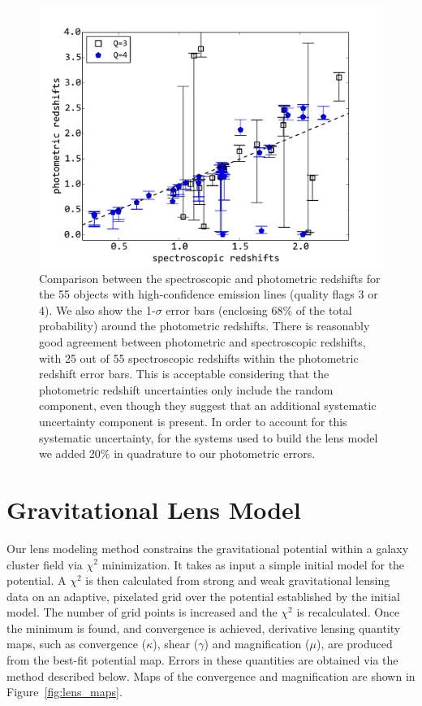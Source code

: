 \begin{figure}
    \centering
    \includegraphics[width=\textwidth]{fig/a2744_ELobjs_photz_vs_specz.pdf}
    \caption[Comparison between the spectroscopic and photometric redshifts.]{Comparison between the spectroscopic and photometric redshifts for the 55 objects with
    high-confidence emission lines (quality flags 3 or 4).  We also show the 1-$\sigma$ error bars (enclosing
    68\% of the total probability) around the photometric redshifts. There is reasonably good agreement between
    photometric and spectroscopic redshifts, with 25 out of 55 spectroscopic redshifts within the photometric
    redshift error bars. This is acceptable considering that the photometric redshift uncertainties only include
    the random component, even though they suggest that an additional systematic uncertainty component is
    present. In order to account for this systematic uncertainty, for the systems used to build the lens model we
    added 20\% in quadrature to our photometric errors.  \label{fig:ELobjs_photz}}
\end{figure}

\section{Gravitational Lens Model}
\label{sec:mass}

Our lens modeling method constrains the gravitational potential within a
galaxy cluster field via $\chi^2$ minimization. It takes as input a
simple initial model for the potential. A $\chi^2$ is then calculated
from strong and weak gravitational lensing data on an adaptive,
pixelated grid over the potential established by the initial
model. The number of grid points is increased and the $\chi^2$ is
recalculated. Once the minimum is found, and convergence is achieved,
derivative lensing quantity maps, such as convergence ($\kappa$),
shear ($\gamma$) and magnification ($\mu$), are produced from the
best-fit potential map. Errors in these quantities are obtained via the method described below.
Maps of the convergence and magnification
are shown in Figure~\ref{fig:lens_maps}.

